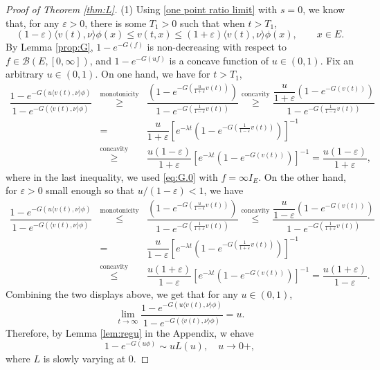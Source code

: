 \documentclass[12pt,a4paper]{amsart}
\numberwithin{equation}{section}
\theoremstyle{plain}
\theoremstyle{definition}
\theoremstyle{remark}
\begin{document}
\begin{proof}[Proof of Theorem \ref{thm:L}]
(1) Using \eqref{one point ratio limit} with $s=0$, we know that, for any $\varepsilon>0$, there is some $T_1>0$ such that when $t>T_1$,
\[
(1-\varepsilon)\langle v(t),\nu\rangle \phi(x)\leq v(t,x)\leq (1+\varepsilon)\langle v(t),\nu\rangle \phi(x),\qquad x\in E.
\]
By Lemma \ref{prop:G},  $1-e^{-G(f)}$ is non-decreasing  with respect to $f\in \mathcal B(E,[0,\infty])$, and $1-e^{-G(uf)}$ is a concave function of $u\in(0,1)$.
Fix an arbitrary $u\in (0, 1)$.
On one hand, we have for $t>T_1$,
\begin{eqnarray}\label{lower}
\dfrac{1-e^{-G(u\langle v(t),\nu\rangle \phi)}}{1-e^{-G(\langle v(t),\nu\rangle \phi)}}&\overset{\text{monotonicity}}\geq& \dfrac{\left(1-e^{-G(\frac{u}{1+\varepsilon}v(t))}\right)}{1-e^{-G(\frac{1}{1-\varepsilon} v(t))}}
\overset{\text{concavity}}\geq \dfrac{\dfrac{u}{1+\varepsilon}\left(1-e^{-G(v(t))}\right)}{1-e^{-G(\frac{1}{1-\varepsilon} v(t))}}
\\
&=&\dfrac{u}{1+\varepsilon}\left[e^{-\lambda t}\left(1-e^{-G(\frac{1}{1-\varepsilon} v(t))}\right)\right]^{-1}\nonumber\\
&\overset{\text{concavity}}\geq& \dfrac{u(1-\varepsilon)}{1+\varepsilon}\left[e^{-\lambda t}\left(1-e^{-G(v(t))}\right)\right]^{-1}=\dfrac{u(1-\varepsilon)}{1+\varepsilon},
\end{eqnarray}
where in the last inequality, we used \eqref{eq:G.0} with $f=\infty I_{E}.$
On the other hand, 
for $\varepsilon>0$ small enough so that $u/(1-\varepsilon)<1$, we have
\begin{eqnarray}\label{upper}
\dfrac{1-e^{-G(u\langle v(t),\nu\rangle \phi)}}{1-e^{-G(\langle v(t),\nu\rangle \phi)}}&\overset{\text{monotonicity}}\leq &\dfrac{\left(1-e^{-G(\frac{u}{1-\epsilon}v(t))}\right)}{1-e^{-G(\frac{1}{1+\varepsilon} v(t))}}\overset{\text{concavity}}\leq \dfrac{\dfrac{u}{1-\varepsilon}\left(1-e^{-G(v(t))}\right)}{1-e^{-G(\frac{1}{1+\varepsilon} v(t))}}\\
&=&\dfrac{u}{1-\varepsilon}\left[e^{-\lambda t}\left(1-e^{-G(\frac{1}{1+\varepsilon} v(t))}\right)\right]^{-1}\\
 &\overset{\text{concavity}}\leq& \dfrac{u(1+\varepsilon)}{1-\varepsilon}\left[e^{-\lambda t}\left(1-e^{-G(v(t))}\right)\right]^{-1}
=\dfrac{u(1+\varepsilon)}{1-\varepsilon}.
\end{eqnarray}
Combining the two displays above, we get that for any $u\in (0, 1)$,
\[
\lim_{t\to\infty}\dfrac{1-e^{-G(u\langle v(t),\nu\rangle \phi)}}{1-e^{-G(\langle v(t),\nu\rangle \phi)}}
=u.
\]
Therefore, by Lemma \ref{lem:regu} in the Appendix, w ehave
\begin{equation}\label{eq regu}
1-e^{-G(u\phi)}\sim uL(u),\quad u\rightarrow 0+,
\end{equation}
where $L$ is slowly varying at $0$.


\end{proof}
\end{document}
